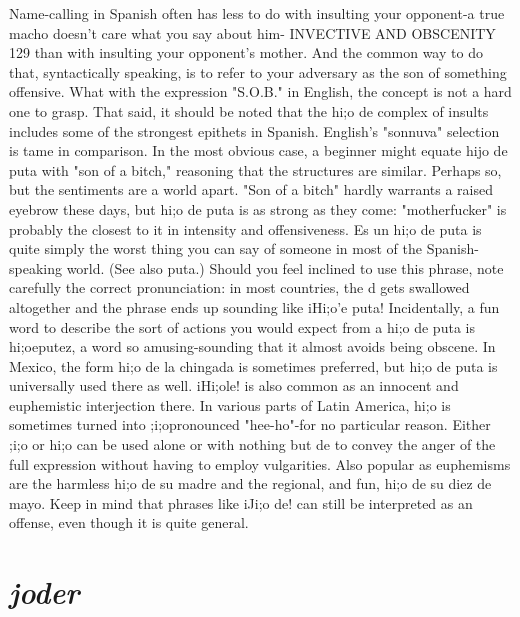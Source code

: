 Name-calling in Spanish often has less to do with insulting
your opponent-a true macho doesn't care what you say about him-
INVECTIVE AND OBSCENITY 129
than with insulting your opponent's mother. And the common way to
do that, syntactically speaking, is to refer to your adversary as the son
of something offensive. What with the expression "S.O.B." in English,
the concept is not a hard one to grasp.
That said, it should be noted that the hi;o de complex of insults includes some of the strongest epithets in Spanish. English's
"sonnuva" selection is tame in comparison. In the most obvious case,
a beginner might equate hijo de puta with "son of a bitch," reasoning
that the structures are similar. Perhaps so, but the sentiments are a
world apart. "Son of a bitch" hardly warrants a raised eyebrow these
days, but hi;o de puta is as strong as they come: "motherfucker" is
probably the closest to it in intensity and offensiveness. Es un hi;o de
puta is quite simply the worst thing you can say of someone in most of
the Spanish-speaking world. (See also puta.) Should you feel inclined
to use this phrase, note carefully the correct pronunciation: in most
countries, the d gets swallowed altogether and the phrase ends up sounding like iHi;o'e puta! Incidentally, a fun word to describe the sort of
actions you would expect from a hi;o de puta is hi;oeputez, a word so
amusing-sounding that it almost avoids being obscene.
In Mexico, the form hi;o de la chingada is sometimes preferred, but hi;o de puta is universally used there as well. iHi;ole! is
also common as an innocent and euphemistic interjection there. In
various parts of Latin America, hi;o is sometimes turned into ;i;opronounced "hee-ho"-for no particular reason. Either ;i;o or hi;o can
be used alone or with nothing but de to convey the anger of the full
expression without having to employ vulgarities. Also popular as euphemisms are the harmless hi;o de su madre and the regional, and fun,
hi;o de su diez de mayo. Keep in mind that phrases like iJi;o de! can
still be interpreted as an offense, even though it is quite general.

\section{\emph{joder}}

